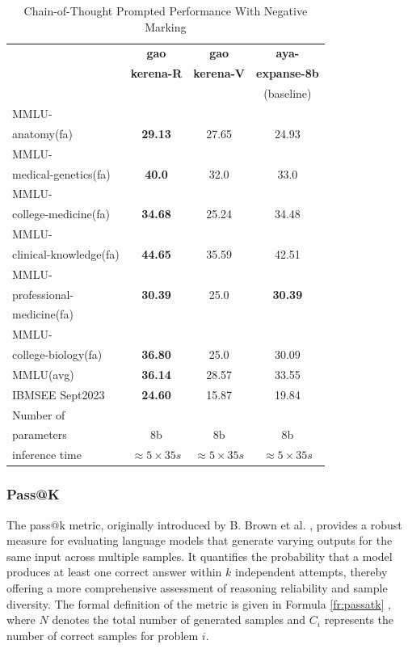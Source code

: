 \documentclass[conference]{IEEEtran}
\begin{document}
	\begin{table}[ht]
		\centering
		\caption{Chain-of-Thought Prompted Performance With Negative Marking}
		\begin{tabular}{|l|c|c|c|}  
			\hline
			\textbf{} & \textbf{gao} & \textbf{gao} & \textbf{aya-} \\ 
			& \textbf{kerena-R} &  \textbf{kerena-V} & \textbf{expanse-8b} \\
			&   & &(baseline)  \\ \hline
			MMLU- &  &  &  \\ 
			anatomy(fa)  & \textbf{29.13} & 27.65  & 24.93  \\ \hline
			MMLU- &    &  &  \\
			medical-genetics(fa) & \textbf{40.0}  & 32.0  & 33.0  \\ \hline
			MMLU- &  &    &  \\
			college-medicine(fa) & \textbf{34.68}  & 25.24  & 34.48  \\ \hline
			MMLU- &    &  &  \\
			clinical-knowledge(fa)& \textbf{44.65} & 35.59  & 42.51  \\ \hline
			MMLU- &  &  &  \\
			professional-& \textbf{30.39} & 25.0 & \textbf{30.39}   \\
                        medicine(fa)& &  &  \\ \hline
			MMLU- &  &  &  \\
			college-biology(fa)& \textbf{36.80} & 25.0  & 30.09  \\ \hline
			MMLU(avg) & \textbf{36.14} & 28.57  & 33.55  \\ \hline
			IBMSEE Sept2023 & \textbf{24.60}  & 15.87 & 19.84   \\ \hline
			Number of&  &  &  \\
			parameters & 8b & 8b & 8b \\ \hline
			inference time & $\approx 5 \times 35s$ & $\approx 5 \times 35s$ & $\approx 5 \times 35s$ \\  \hline
		\end{tabular}
		\label{tab:med_reasoning_capabillities_NM_comparison}
	\end{table}
           
           \subsubsection{Pass@K}
The pass@k metric, originally introduced by B. Brown et al.
\cite{b24}, 
provides a robust measure for evaluating language models that generate varying outputs for the same input across multiple samples. It quantifies the probability that a model produces at least one correct answer within \(k\) independent attempts, thereby offering a more comprehensive assessment of reasoning reliability and sample diversity. The formal definition of the metric is given in Formula
\ref{fr:passatk}
, where \(N\) denotes the total number of generated samples and \(C_i\) represents the number of correct samples for problem \(i\).
\end{document}
